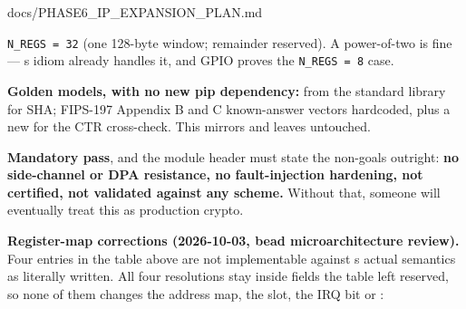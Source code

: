 \begin{relocated}{docs/PHASE6_IP_EXPANSION_PLAN.md}
{}

\texttt{N\_\allowbreak{}REGS\ =\allowbreak{}\ 32} (one 128-byte window;
remainder reserved). A power-of-two  is fine ---
\textquotesingle s  idiom
already handles it, and GPIO proves the
\texttt{N\_\allowbreak{}REGS\ =\allowbreak{}\ 8} case.

\textbf{Golden models, with no new pip dependency:}
 from the standard library for SHA; FIPS-197
Appendix B and C known-answer vectors hardcoded, plus a new
 for the CTR cross-check. This mirrors
 and leaves 
untouched.

\warn{} \textbf{Mandatory  pass}, and the module
header must state the non-goals outright: \textbf{no side-channel or DPA
resistance, no fault-injection hardening, not certified, not validated
against any scheme.} Without that, someone will eventually treat this as
production crypto.

\textbf{Register-map corrections (2026-10-03, bead 
microarchitecture review).} Four entries in the table above are not
implementable against \textquotesingle s actual
semantics as literally written. All four resolutions stay inside fields
the table left reserved, so none of them changes the address map, the
slot, the IRQ bit or :


\end{relocated}
